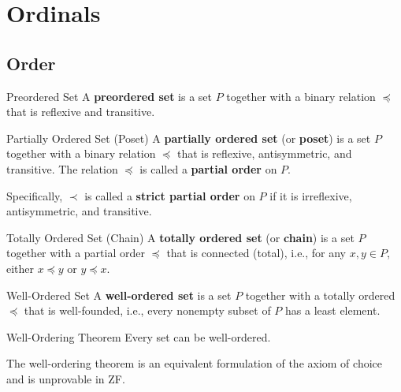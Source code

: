 \chapter{Ordinals} %
\section{Order}
\begin{definition}{Preordered Set} %
    A \textbf{preordered set} is a set \(P\) together with a binary relation \(\preceq\) 
    that is reflexive and transitive.
\end{definition}

\begin{definition}{Partially Ordered Set (Poset)} %
    A \textbf{partially ordered set} (or \textbf{poset}) is a set \(P\) together with a binary relation \(\preceq\) 
    that is reflexive, antisymmetric, and transitive.
    The relation \(\preceq\) is called a \textbf{partial order} on \(P\).
    
    Specifically, \(\prec\) is called a \textbf{strict partial order} on \(P\) if it is irreflexive, antisymmetric, and transitive.
\end{definition}

\begin{definition}{Totally Ordered Set (Chain)} %
    A \textbf{totally ordered set} (or \textbf{chain}) is a set \(P\) together with a partial order \(\preceq\)
    that is connected (total), i.e., for any \(x, y \in P\), either \(x \preceq y\) or \(y \preceq x\).
\end{definition}

\begin{definition}{Well-Ordered Set} %
    A \textbf{well-ordered set} is a set \(P\) together with a totally ordered \(\preceq\) that is well-founded, 
    i.e., every nonempty subset of \(P\) has a least element.
\end{definition}

\begin{theorem}{Well-Ordering Theorem} %
    Every set can be well-ordered.
\end{theorem}

\begin{note}
    The well-ordering theorem is an equivalent formulation of the axiom of choice and is unprovable in ZF.
\end{note}

